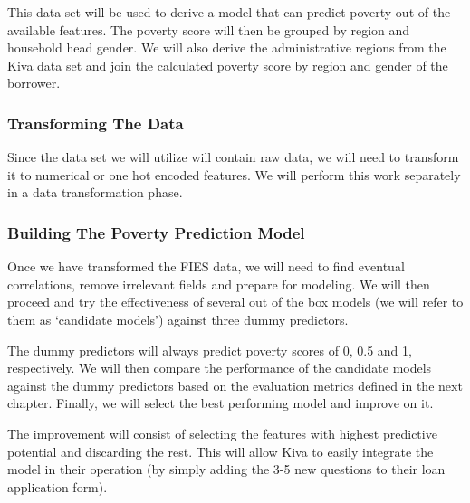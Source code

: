 \documentclass{article}
\begin{document}
This data set will be used to derive a model that can predict poverty out of the available features. The poverty score will then be grouped by region and household head gender. We will also derive the administrative regions from the Kiva data set and join the calculated poverty score by region and gender of the borrower.

\subsubsection{Transforming The Data}
Since the data set we will utilize will contain raw data, we will need to transform it to numerical or one hot encoded features. We will perform this work separately in a data transformation phase.
\subsubsection{Building The Poverty Prediction Model}
Once we have transformed the FIES data, we will need to find eventual correlations, remove irrelevant fields and prepare for modeling. We will then proceed and try the effectiveness of several out of the box models (we will refer to them as ‘candidate models’) against three dummy predictors.

The dummy predictors will always predict poverty scores of 0, 0.5 and 1, respectively. We will then compare the performance of the candidate models against the dummy predictors based on the evaluation metrics defined in the next chapter. Finally, we will select the best performing model and improve on it.

The improvement will consist of selecting the features with highest predictive potential and discarding the rest. This will allow Kiva to easily integrate the model in their operation (by simply adding the 3-5 new questions to their loan application form).
\end{document}

